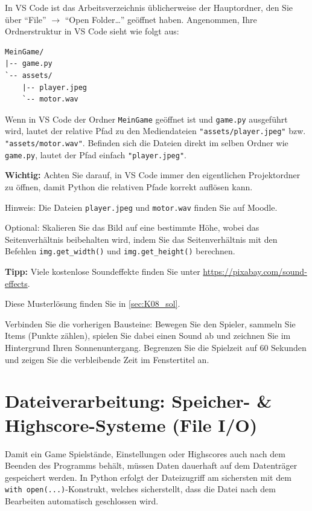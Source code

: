 \begin{myexercise}
\begin{myattention}
        In VS Code ist das Arbeitsverzeichnis üblicherweise der Hauptordner, den Sie über \enquote{File} $\rightarrow$ \enquote{Open Folder\dots} geöffnet haben. Angenommen, Ihre Ordnerstruktur in VS Code sieht wie folgt aus:
        \begin{center}
        \begin{minipage}{0.45\textwidth}
\begin{lstlisting}[numbers=none]
MeinGame/
|-- game.py
`-- assets/
    |-- player.jpeg
    `-- motor.wav
\end{lstlisting}
        \end{minipage}
        \end{center}
        Wenn in VS Code der Ordner \texttt{MeinGame} geöffnet ist und \texttt{game.py} ausgeführt wird, lautet der relative Pfad zu den Mediendateien \lstinline|"assets/player.jpeg"| bzw. \lstinline|"assets/motor.wav"|. Befinden sich die Dateien direkt im selben Ordner wie \texttt{game.py}, lautet der Pfad einfach \lstinline|"player.jpeg"|.

        \textbf{Wichtig:} Achten Sie darauf, in VS Code immer den eigentlichen Projektordner zu öffnen, damit Python die relativen Pfade korrekt auflösen kann.
    \end{myattention}

    Hinweis: Die Dateien \texttt{player.jpeg} und \texttt{motor.wav} finden Sie auf Moodle.

    Optional: Skalieren Sie das Bild auf eine bestimmte Höhe, wobei das Seitenverhältnis beibehalten wird, indem Sie das Seitenverhältnis mit den Befehlen \lstinline|img.get_width()| und \lstinline|img.get_height()| berechnen.

    \textbf{Tipp:} Viele kostenlose Soundeffekte finden Sie unter \url{https://pixabay.com/sound-effects}.
	\begin{myanswer}
		Diese Musterlösung finden Sie in \cref{sec:K08_sol}.
	\end{myanswer}
\end{myexercise}

\begin{mychallenge}
    Verbinden Sie die vorherigen Bausteine: Bewegen Sie den Spieler, sammeln Sie Items (Punkte zählen), spielen Sie dabei einen Sound ab und zeichnen Sie im Hintergrund Ihren Sonnenuntergang. Begrenzen Sie die Spielzeit auf 60 Sekunden und zeigen Sie die verbleibende Zeit im Fenstertitel an.
\end{mychallenge}

\section{Dateiverarbeitung: Speicher- \& Highscore-Systeme (File I/O)}
Damit ein Game Spielstände, Einstellungen oder Highscores auch nach dem Beenden des Programms behält, müssen Daten dauerhaft auf dem Datenträger gespeichert werden. In Python erfolgt der Dateizugriff am sichersten mit dem \lstinline|with open(...)|-Konstrukt, welches sicherstellt, dass die Datei nach dem Bearbeiten automatisch geschlossen wird.

